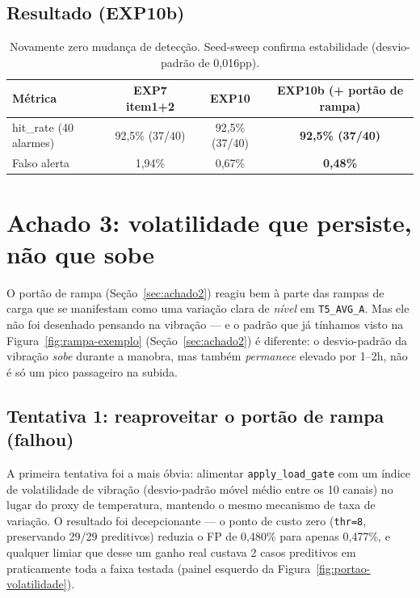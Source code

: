 \documentclass[11pt,a4paper]{article}
\begin{document}
\subsection{Resultado (EXP10b)}

\begin{table}[H]
\centering
\begin{tabular}{@{}lccc@{}}
\toprule
\textbf{Métrica} & \textbf{EXP7 item1+2} & \textbf{EXP10} & \textbf{EXP10b (+ portão de rampa)} \\
\midrule
hit\_rate (40 alarmes) & 92,5\% (37/40) & 92,5\% (37/40) & \textbf{92,5\% (37/40)} \\
Falso alerta & 1,94\% & 0,67\% & \textbf{0,48\%} \\
\bottomrule
\end{tabular}
\caption{Novamente zero mudança de detecção. Seed-sweep confirma
estabilidade (desvio-padrão de 0,016pp).}
\end{table}

\section{Achado 3: volatilidade que persiste, não que sobe}
\label{sec:achado3}

O portão de rampa (Seção~\ref{sec:achado2}) reagiu bem à parte das
rampas de carga que se manifestam como uma variação clara de
\emph{nível} em \texttt{T5\_AVG\_A}. Mas ele não foi desenhado pensando
na vibração --- e o padrão que já tínhamos visto na
Figura~\ref{fig:rampa-exemplo} (Seção~\ref{sec:achado2}) é diferente: o
desvio-padrão da vibração \emph{sobe} durante a manobra, mas também
\emph{permanece} elevado por 1--2h, não é só um pico passageiro na
subida.

\subsection{Tentativa 1: reaproveitar o portão de rampa (falhou)}

A primeira tentativa foi a mais óbvia: alimentar
\texttt{apply\_load\_gate} com um índice de volatilidade de vibração
(desvio-padrão móvel médio entre os 10 canais) no lugar do proxy de
temperatura, mantendo o mesmo mecanismo de taxa de variação. O resultado
foi decepcionante --- o ponto de custo zero (\texttt{thr=8}, preservando
29/29 preditivos) reduzia o FP de 0,480\% para apenas 0,477\%, e
qualquer limiar que desse um ganho real custava 2 casos preditivos em
praticamente toda a faixa testada (painel esquerdo da
Figura~\ref{fig:portao-volatilidade}).
\end{document}

